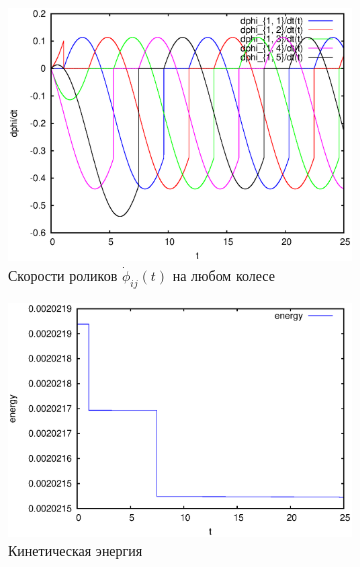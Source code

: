 \begin{figure}[H]
    \begin{subfigure}[t]{0.3\textwidth}
        \centering
        \includegraphics[width=\linewidth]{pic/rol__self_rot__velocities_of_rollers_of_wheel_1}
        \caption{Скорости роликов $\dot{\phi}_{ij}(t)$ на любом колесе}
        \label{fig:rol__self_rot__velocities_of_rollers_of_wheel_1}
    \end{subfigure}
    \begin{subfigure}[t]{0.3\textwidth}
        \centering
        \includegraphics[width=\linewidth]{pic/rol__self_rot__kinetic_energy}
        \caption{Кинетическая энергия}
        \label{fig:rol__self_rot__kinetic_energy}    
    \end{subfigure}
    \begin{subfigure}[t]{0.3\textwidth}
        \centering

\end{subfigure}
\end{figure}
